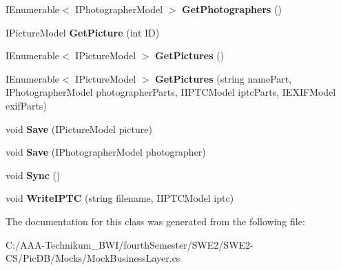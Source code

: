 \begin{DoxyCompactItemize}
\item 
\mbox{\label{class_pic_d_b_1_1_mocks_1_1_mock_business_layer_af475b2eeb81f1cc0bfbd23fb58dfe118}} 
I\+Enumerable$<$ I\+Photographer\+Model $>$ {\bfseries Get\+Photographers} ()
\item 
\mbox{\label{class_pic_d_b_1_1_mocks_1_1_mock_business_layer_adf79d8b71bcd31bd4c2215a7a68d0bb3}} 
I\+Picture\+Model {\bfseries Get\+Picture} (int ID)
\item 
\mbox{\label{class_pic_d_b_1_1_mocks_1_1_mock_business_layer_a052290b06e800604e6c464194883cd86}} 
I\+Enumerable$<$ I\+Picture\+Model $>$ {\bfseries Get\+Pictures} ()
\item 
\mbox{\label{class_pic_d_b_1_1_mocks_1_1_mock_business_layer_a874b65f478c8278fa4354f0584949e95}} 
I\+Enumerable$<$ I\+Picture\+Model $>$ {\bfseries Get\+Pictures} (string name\+Part, I\+Photographer\+Model photographer\+Parts, I\+I\+P\+T\+C\+Model iptc\+Parts, I\+E\+X\+I\+F\+Model exif\+Parts)
\item 
\mbox{\label{class_pic_d_b_1_1_mocks_1_1_mock_business_layer_a8168b332927e3557ce17b6cbd75869f1}} 
void {\bfseries Save} (I\+Picture\+Model picture)
\item 
\mbox{\label{class_pic_d_b_1_1_mocks_1_1_mock_business_layer_a9bdf6b16cb1016fa217c1f4576d56a5d}} 
void {\bfseries Save} (I\+Photographer\+Model photographer)
\item 
\mbox{\label{class_pic_d_b_1_1_mocks_1_1_mock_business_layer_a30a2c94a9bed95c115b8e8a394a99ad2}} 
void {\bfseries Sync} ()
\item 
\mbox{\label{class_pic_d_b_1_1_mocks_1_1_mock_business_layer_a1ac0ed401d7c32ec58e92dd3a91c7387}} 
void {\bfseries Write\+I\+P\+TC} (string filename, I\+I\+P\+T\+C\+Model iptc)
\end{DoxyCompactItemize}


The documentation for this class was generated from the following file\+:\begin{DoxyCompactItemize}
\item 
C\+:/\+A\+A\+A-\/\+Technikum\+\_\+\+B\+W\+I/fourth\+Semester/\+S\+W\+E2/\+S\+W\+E2-\/\+C\+S/\+Pic\+D\+B/\+Mocks/Mock\+Business\+Layer.\+cs\end{DoxyCompactItemize}
